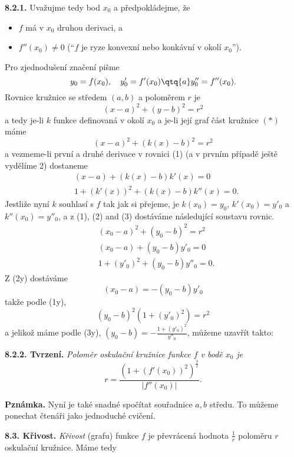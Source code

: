 \documentclass[12pt]{article}
\begin{document}
{ {\bf 8.2.1.} Uvažujme tedy bod $x_0$ a předpokládejme, že
 \begin{itemize}
 \item $f$ má v $x_0$ druhou derivaci, a
 \item $f''(x_0)\neq 0$ (``$f$ je ryze konvexní nebo konkávní v okolí $x_0$'').
 \end{itemize}
 Pro zjednodušení značení pišme
 $$
 y_0=f(x_0),\quad y'_0=f'(x_0)\qtq{a} y''_0=f''(x_0).
 $$
 Rovnice kružnice se středem $(a,b)$ a poloměrem $r$ je
\begin{equation}
 (x-a)^2+(y-b)^2=r^2 \tag{$*$}
 \end{equation}
 a tedy je-li $k$  funkce definovaná v okolí $x_0$ a je-li její graf část kružnice
 $(*)$ máme
 \begin{equation}
 (x-a)^2+(k(x)-b)^2=r^2 \tag{1}
 \end{equation}
 a vezmeme-li první a druhé derivace v rovnici (1) (a v prvním případě ještě vydělíme  2) dostaneme
 \begin{align}
 &(x-a)+(k(x)-b)k'(x)=0  \tag{2}\\
 &1+ (k'(x))^2+ (k(x)-b)k''(x)=0. \tag{3}
 \end{align}
 Jestliže nyní $k$ souhlasí s $f$ tak jak si přejeme, je $k(x_0)=y_0$, $k'(x_0)=y'_0$ a
 $k''(x_0)=y''_0$, a z (1), (2) and (3) dostáváme následující soustavu rovnic.
  \begin{align}
 &(x_0-a)^2+(y_0-b)^2=r^2 \tag{1y}\\ 
 &(x_0-a)+(y_0-b)y'_0=0  \tag{2y}\\
 &1+ (y'_0)^2+ (y_0-b)y''_0=0. \tag{3y}
 \end{align}
 Z (2y) dostáváme
 $$
 (x_0-a)=-(y_0-b)y'_0
 $$
 takže podle (1y),
 $$
 (y_0-b)^2(1+(y'_0)^2)=r^2
 $$
 a jelikož máme podle (3y),  $(y_0-b)=-\frac{1+ (y'_0)^2}{y''_0}$,
 můžeme uzavřít takto:
 
 \medskip
 
 {\bf 8.2.2. Tvrzení.} {\em Poloměr oskulační kružnice funkce $f$ v bodě $x_0$ je
 $$
 r=\frac{(1+(f'(x_0))^2)^\frac32}{|f''(x_0)|}.
 $$}\sq
 
 \medskip
 
 {\bf Pznámka.} Nyní je také  snadn\'e spočítat souřadnice $a,b$ středu. To můžeme ponechat čtenáři jako jednoduché cvičení.
 
 \bigskip
 
 {\bf 8.3. Křivost.} {\em Křivost}  (grafu) funkce $f$ je převrácená hodnota $\frac1{r}$ poloměru $r$ oskulační kružnice. Máme tedy

}
\end{document}
